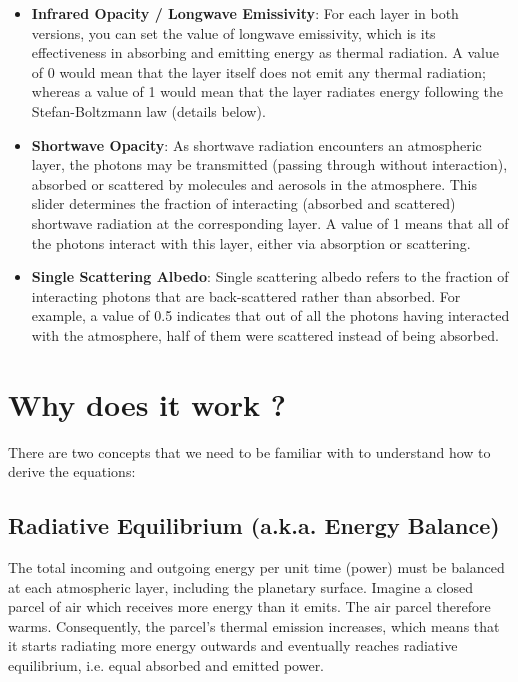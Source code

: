 \documentclass[a4paper,12pt]{article}
\begin{document}
\begin{itemize}
    \item \textbf{Infrared Opacity / Longwave Emissivity}: For each layer in both versions, you can set the value of longwave emissivity, which is its effectiveness in absorbing and emitting energy as thermal radiation. A value of 0 would mean that the layer itself does not emit any thermal radiation; whereas a value of 1 would mean that the layer radiates energy following the Stefan-Boltzmann law (details below).
    
    \item \textbf{Shortwave Opacity}: As shortwave radiation encounters an atmospheric layer, the photons may be transmitted (passing through without interaction), absorbed or scattered by molecules and aerosols in the atmosphere. This slider determines the fraction of interacting (absorbed and scattered) shortwave radiation at the corresponding layer. A value of 1 means that all of the photons interact with this layer, either via absorption or scattering. 
    
    \item \textbf{Single Scattering Albedo}: Single scattering albedo refers to the fraction of interacting photons that are back-scattered rather than absorbed. For example, a value of 0.5 indicates that out of all the photons having interacted with the atmosphere, half of them were scattered instead of being absorbed.
    
\end{itemize}



\section*{Why does it work ?}

There are two concepts that we need to be familiar with to understand how to derive the equations:

\subsection*{Radiative Equilibrium (a.k.a. Energy Balance)}

The total incoming and outgoing energy per unit time (power) must be balanced at each atmospheric layer, including the planetary surface. Imagine a closed parcel of air which receives more energy than it emits. The air parcel therefore warms. Consequently, the parcel's thermal emission increases, which means that it starts radiating more energy outwards and eventually reaches radiative equilibrium, i.e. equal absorbed and emitted power.
\end{document}

